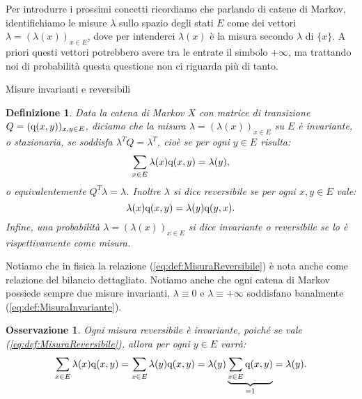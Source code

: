 \documentclass[11pt]{book}
\theoremstyle{Definizione}
\newtheorem*{mydef}{Definizione}
\theoremstyle{TeoremaProposizioneLemmaCorollario}
\theoremstyle{OsservazioneNota}
\newtheorem{myobs}{Osservazione}[section]
\newcommand{\q}{\textup{q}}
\begin{document}
\noindent
Per introdurre i prossimi concetti ricordiamo che parlando di catene di Markov, identifichiamo le misure $\lambda$ sullo spazio degli stati $E$ come dei vettori $\lambda = (\lambda(x))_{x\in E}$, dove per intenderci $\lambda(x)$ è la misura secondo $\lambda$ di $\{x\}$. A priori questi vettori potrebbero avere tra le entrate il simbolo $+\infty$, ma trattando noi di probabilità questa questione non ci riguarda più di tanto.
\begin{boxdef}{Misure invarianti e reversibili}
\begin{mydef}
Data la catena di Markov $X$ con matrice di transizione $Q = (\q(x,y))_{x,y\in E}$, diciamo che la misura $\lambda = (\lambda(x))_{x\in E}$ su $E$ è invariante, o stazionaria, se soddisfa $\lambda^T Q = \lambda^T$, cioè se per ogni $y\in E$ risulta:
\begin{equation}\label{eq:def:MisuraInvariante}
\sum_{x\in E} \lambda(x) \q(x,y) = \lambda(y),
\end{equation}
o equivalentemente $Q^T \lambda = \lambda$. Inoltre $\lambda$ si dice reversibile se per ogni $x,y\in E$ vale:
\begin{equation}\label{eq:def:MisuraReversibile}
\lambda(x)\q(x,y) = \lambda(y)\q(y,x).
\end{equation}
Infine, una probabilità $\lambda = (\lambda(x))_{x\in E}$ si dice invariante o reversibile se lo è rispettivamente come misura.
\end{mydef}
\end{boxdef}
\noindent
Notiamo che in fisica la relazione (\ref{eq:def:MisuraReversibile}) è nota anche come relazione del bilancio dettagliato. Notiamo anche che ogni catena di Markov possiede sempre due misure invarianti, $\lambda \equiv 0$ e $\lambda \equiv +\infty$ soddisfano banalmente (\ref{eq:def:MisuraInvariante}).
\begin{myobs}
Ogni misura reversibile è invariante, poiché se vale (\ref{eq:def:MisuraReversibile}), allora per ogni $y\in E$ varrà:
$$
\sum_{x\in E} \lambda(x)\q(x,y) = \sum_{x\in E} \lambda(y)\q(x,y) = \lambda(y) \underbrace{\sum_{x \in E} \q(x,y)}_{ = 1} = \lambda (y).
$$
\end{myobs}
\end{document}
